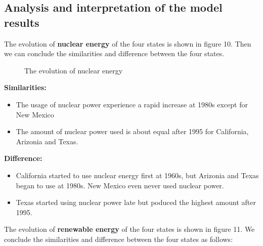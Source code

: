 \documentclass{mcmthesis}
\begin{document}
\subsection{Analysis and interpretation of the model results}

The evolution of {\bf{ nuclear energy}} of the four states is shown in figure 10. Then we can conclude the similarities and difference between the four states.

\begin{figure}[H]
  \caption{The evolution of nuclear energy}\label{figure10}
\end{figure}

\newpage

{\bf{Similarities:}}

\begin{itemize}
\item The usage of nuclear power experience a rapid increase at 1980s except for New Mexico
\item The amount of nuclear power used is about equal after 1995 for California, Arizonia and Texas.
\end{itemize}

{\bf{Difference:}}

\begin{itemize}
\item California started to use nuclear energy first at 1960s, but Arizonia and Texas began to use at 1980s. New Mexico even never used nuclear power.
\item Texas started using nuclear power late but poduced the highest amount after 1995.
\end{itemize}

The evolution of {\bf{renewable energy}} of the four states is shown in figure 11. We conclude the similarities and difference between the four states as follows:
\end{document}
